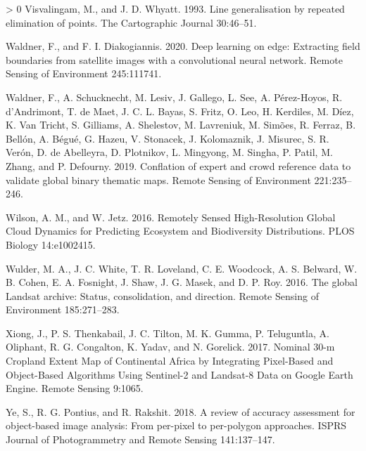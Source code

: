 \documentclass[11pt,a4paper]{article}
\newlength{\cslhangindent}
\newenvironment{CSLReferences}[3] %
 {%
  \setlength{\parindent}{0pt}
  \ifodd #1 \everypar{\setlength{\hangindent}{\cslhangindent}}\ignorespaces\fi
  \ifnum #2 > 0
  \setlength{\parskip}{#2\baselineskip}
  \fi
 }%
 {}
\begin{document}
\begin{CSLReferences}{1}{0}
\leavevmode\hypertarget{ref-visvalingamLineGeneralisationRepeated1993}{}%
Visvalingam, M., and J. D. Whyatt. 1993. Line generalisation by repeated
elimination of points. The Cartographic Journal 30:46--51.

\leavevmode\hypertarget{ref-waldnerDeepLearningEdge2020}{}%
Waldner, F., and F. I. Diakogiannis. 2020. Deep learning on edge:
Extracting field boundaries from satellite images with a convolutional
neural network. Remote Sensing of Environment 245:111741.

\leavevmode\hypertarget{ref-WaldnerConflationexpertcrowd2019}{}%
Waldner, F., A. Schucknecht, M. Lesiv, J. Gallego, L. See, A.
Pérez-Hoyos, R. d'Andrimont, T. de Maet, J. C. L. Bayas, S. Fritz, O.
Leo, H. Kerdiles, M. Díez, K. Van Tricht, S. Gilliams, A. Shelestov, M.
Lavreniuk, M. Simões, R. Ferraz, B. Bellón, A. Bégué, G. Hazeu, V.
Stonacek, J. Kolomaznik, J. Misurec, S. R. Verón, D. de Abelleyra, D.
Plotnikov, L. Mingyong, M. Singha, P. Patil, M. Zhang, and P. Defourny.
2019. Conflation of expert and crowd reference data to validate global
binary thematic maps. Remote Sensing of Environment 221:235--246.

\leavevmode\hypertarget{ref-WilsonRemotelySensedHighResolution2016}{}%
Wilson, A. M., and W. Jetz. 2016. Remotely {Sensed High}-{Resolution
Global Cloud Dynamics} for {Predicting Ecosystem} and {Biodiversity
Distributions}. PLOS Biology 14:e1002415.

\leavevmode\hypertarget{ref-WulderglobalLandsatarchive2016}{}%
Wulder, M. A., J. C. White, T. R. Loveland, C. E. Woodcock, A. S.
Belward, W. B. Cohen, E. A. Fosnight, J. Shaw, J. G. Masek, and D. P.
Roy. 2016. The global {Landsat} archive: Status, consolidation, and
direction. Remote Sensing of Environment 185:271--283.

\leavevmode\hypertarget{ref-XiongNominal30mCropland2017}{}%
Xiong, J., P. S. Thenkabail, J. C. Tilton, M. K. Gumma, P. Teluguntla,
A. Oliphant, R. G. Congalton, K. Yadav, and N. Gorelick. 2017. Nominal
30-m {Cropland Extent Map} of {Continental Africa} by {Integrating
Pixel}-{Based} and {Object}-{Based Algorithms Using Sentinel}-2 and
{Landsat}-8 {Data} on {Google Earth Engine}. Remote Sensing 9:1065.

\leavevmode\hypertarget{ref-yeReviewAccuracyAssessment2018}{}%
Ye, S., R. G. Pontius, and R. Rakshit. 2018. A review of accuracy
assessment for object-based image analysis: From per-pixel to
per-polygon approaches. ISPRS Journal of Photogrammetry and Remote
Sensing 141:137--147.


\end{CSLReferences}
\end{document}

